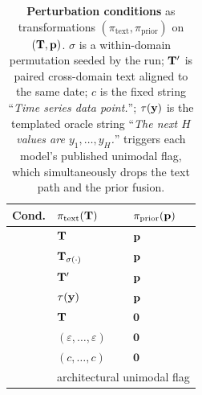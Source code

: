 \begin{table}[t]
\centering
\caption{\textbf{Perturbation conditions} as transformations
$(\pi_{\text{text}}, \pi_{\text{prior}})$ on $(\mathbf{T}, \mathbf{p})$.
$\sigma$ is a within-domain permutation seeded by the run; $\mathbf{T}'$
is paired cross-domain text aligned to the same date; $c$ is the
fixed string ``\textit{Time series data point.}''; $\tau(\mathbf{y})$
is the templated oracle string ``\textit{The next $H$ values are
$y_1,\dots,y_H$.}''  \Csix{} triggers each model's published
unimodal flag, which simultaneously drops the text path and the
prior fusion.}
\label{tab:perturbations}
\small
\setlength{\tabcolsep}{6pt}
\renewcommand{\arraystretch}{1.18}
\begin{tabular}{l l l}
\toprule
\textbf{Cond.} & $\pi_{\text{text}}(\mathbf{T})$ & $\pi_{\text{prior}}(\mathbf{p})$ \\
\midrule
\Cone{}    & $\mathbf{T}$                              & $\mathbf{p}$    \\
\Cthree{}  & $\mathbf{T}_{\sigma(\cdot)}$              & $\mathbf{p}$    \\
\Cfour{}   & $\mathbf{T}'$                             & $\mathbf{p}$    \\
\Ceight{}  & $\tau(\mathbf{y})$                      & $\mathbf{p}$    \\
\Cnine{}   & $\mathbf{T}$                              & $\mathbf{0}$ \\
\Ctwo{}    & $(\varepsilon,\ldots,\varepsilon)$    & $\mathbf{0}$ \\
\Cfive{}   & $(c,\ldots,c)$                        & $\mathbf{0}$ \\
\Csix{}    & \multicolumn{2}{l}{architectural unimodal flag} \\
\bottomrule
\end{tabular}
\end{table}
